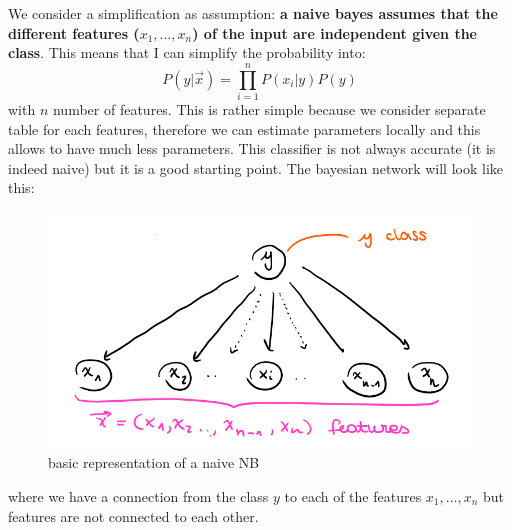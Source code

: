 We consider a simplification as assumption: \textbf{a naive bayes assumes that
the different features ($x_{1}, \dots, x_{n}$) of the input are independent
given the class}. This means that I can simplify the probability into:
\[
	P(y|\Vec{x}) = \prod_{i=1}^{n} P(x_{i}|y)P(y)
\]
with $n$ number of features. This is rather simple because we consider separate table
for each features, therefore we can estimate parameters locally and this allows
to have much less parameters. This classifier is not always accurate (it is
indeed naive) but it is a good starting point. The bayesian network will look
like this: \\
\begin{figure}[H]
	\centering
	\includegraphics[scale=0.4]{
        images/11_NaiveBayes_naiveBayes.png
    }
	\caption{basic representation of a naive NB}
	\label{fig:naive}
\end{figure}
where we have a connection from the class $y$ to each of the features $x_{1}, \dots
, x_{n}$ but features are not connected to each other.

